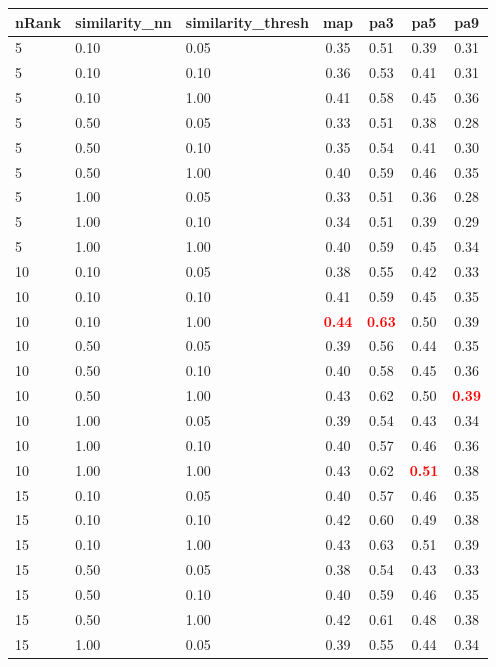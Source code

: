   
\begin{table} 
\begin{center} 
\scriptsize 
 \setlength{\tabcolsep}{.16667em} 
\begin{tabular}{lllcccc} 
nRank & similarity\_nn & similarity\_thresh & map & pa3 & pa5 & pa9 \\ 
\hline 
 5 & 0.10 & 0.05 & 0.35 & 0.51 & 0.39 & 0.31 \\ 
 5 & 0.10 & 0.10 & 0.36 & 0.53 & 0.41 & 0.31 \\ 
 5 & 0.10 & 1.00 & 0.41 & 0.58 & 0.45 & 0.36 \\ 
 5 & 0.50 & 0.05 & 0.33 & 0.51 & 0.38 & 0.28 \\ 
 5 & 0.50 & 0.10 & 0.35 & 0.54 & 0.41 & 0.30 \\ 
 5 & 0.50 & 1.00 & 0.40 & 0.59 & 0.46 & 0.35 \\ 
 5 & 1.00 & 0.05 & 0.33 & 0.51 & 0.36 & 0.28 \\ 
 5 & 1.00 & 0.10 & 0.34 & 0.51 & 0.39 & 0.29 \\ 
 5 & 1.00 & 1.00 & 0.40 & 0.59 & 0.45 & 0.34 \\ 
10 & 0.10 & 0.05 & 0.38 & 0.55 & 0.42 & 0.33 \\ 
10 & 0.10 & 0.10 & 0.41 & 0.59 & 0.45 & 0.35 \\ 
10 & 0.10 & 1.00 & \textbf{\textcolor{red}{0.44}} & \textbf{\textcolor{red}{0.63}} & 0.50 & 0.39 \\ 
10 & 0.50 & 0.05 & 0.39 & 0.56 & 0.44 & 0.35 \\ 
10 & 0.50 & 0.10 & 0.40 & 0.58 & 0.45 & 0.36 \\ 
10 & 0.50 & 1.00 & 0.43 & 0.62 & 0.50 & \textbf{\textcolor{red}{0.39}} \\ 
10 & 1.00 & 0.05 & 0.39 & 0.54 & 0.43 & 0.34 \\ 
10 & 1.00 & 0.10 & 0.40 & 0.57 & 0.46 & 0.36 \\ 
10 & 1.00 & 1.00 & 0.43 & 0.62 & \textbf{\textcolor{red}{0.51}} & 0.38 \\ 
15 & 0.10 & 0.05 & 0.40 & 0.57 & 0.46 & 0.35 \\ 
15 & 0.10 & 0.10 & 0.42 & 0.60 & 0.49 & 0.38 \\ 
15 & 0.10 & 1.00 & 0.43 & 0.63 & 0.51 & 0.39 \\ 
15 & 0.50 & 0.05 & 0.38 & 0.54 & 0.43 & 0.33 \\ 
15 & 0.50 & 0.10 & 0.40 & 0.59 & 0.46 & 0.35 \\ 
15 & 0.50 & 1.00 & 0.42 & 0.61 & 0.48 & 0.38 \\ 
15 & 1.00 & 0.05 & 0.39 & 0.55 & 0.44 & 0.34 \\ 

\end{tabular}
\end{center}
\end{table}
